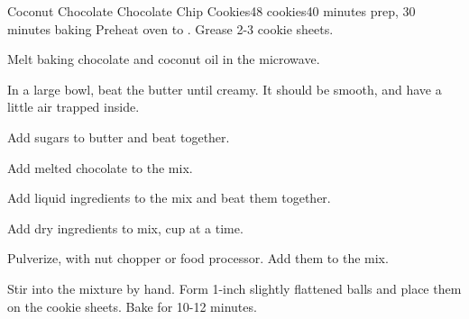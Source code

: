 \documentclass[../Cookbook.tex]{subfiles}
\begin{document}
\begin{recipe}{Coconut Chocolate Chocolate Chip Cookies}{48 cookies}{40 minutes prep, 30 minutes baking}
	Preheat oven to . Grease 2-3 cookie sheets.

	Melt baking chocolate and coconut oil in the microwave.


	In a large bowl, beat the butter until creamy. It should be smooth, and have a little air trapped inside.

	Add sugars to butter and beat together.

	\newstep
	Add melted chocolate to the mix.

	Add liquid ingredients to the mix and beat them together.

	Add dry ingredients to mix,  cup at a time.

	Pulverize, with nut chopper or food processor. Add them to the mix.

	Stir into the mixture by hand. Form 1-inch slightly flattened balls and place them on the cookie sheets. Bake for 10-12 minutes.

\end{recipe}
\end{document}

